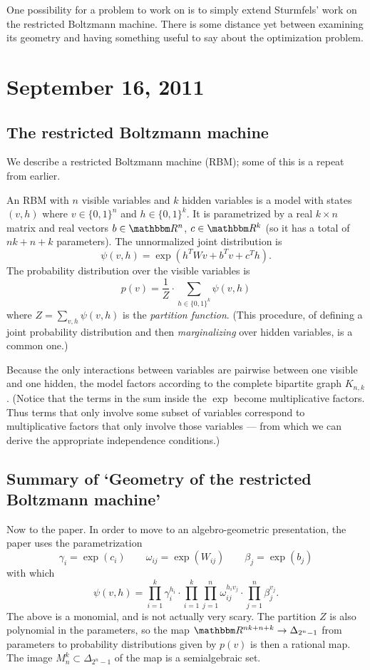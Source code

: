 \documentclass[12pt]{article}
\begin{document}
One possibility for a problem to work on is to simply extend Sturmfels' work on
the restricted Boltzmann machine.  There is some distance yet between examining
its geometry and having something useful to say about the optimization problem.

\section{September 16, 2011}


\subsection{The restricted Boltzmann machine}

We describe a restricted Boltzmann machine (RBM); some of this is a repeat from
earlier.

An RBM with $n$ visible variables and $k$ hidden variables is a model with
states $(v, h)$ where $v \in \{0,1\}^n$ and $h \in \{0,1\}^k$.  It is
parametrized by a real $k \times n$ matrix and real vectors $b \in \R^n$, $c \in
\R^k$ (so it has a total of $nk + n + k$ parameters).  The unnormalized joint
distribution is
\[
    \psi(v, h) = \exp(h^T W v + b^Tv + c^T h).
\]
The probability distribution over the visible variables is 
\[
    p(v) = \frac 1 Z \cdot \sum_{h \in \{0,1\}^k} \psi(v, h)
\]
where $Z = \sum_{v,h} \psi(v, h)$ is the \emph{partition function}.  (This
procedure, of defining a joint probability distribution and then
\emph{marginalizing} over hidden variables, is a common one.)

Because the only interactions between variables are pairwise between one visible
and one hidden, the model factors according to the complete bipartite graph
$K_{n,k}$.  (Notice that the terms in the sum inside the $\exp$ become
multiplicative factors.  Thus terms that only involve some subset of variables
correspond to multiplicative factors that only involve those variables --- from
which we can derive the appropriate independence conditions.)

\subsection{Summary of `Geometry of the restricted Boltzmann machine'}

Now to the paper.  In order to move to an algebro-geometric presentation, the
paper uses the parametrization
\[
    \gamma_i = \exp(c_i)
    \qquad
    \omega_{ij} = \exp(W_{ij})
    \qquad
    \beta_j = \exp(b_j)
\]
with which
\[
    \psi(v, h) = \prod_{i=1}^k \gamma_i^{h_i}
        \cdot 
        \prod_{i=1}^k \prod_{j=1}^n \omega_{ij}^{h_i v_j}
        \cdot
        \prod_{j=1}^n \beta_j^{v_j}.
\]
The above is a monomial, and is not actually very scary.  The partition $Z$ is
also polynomial in the parameters, so the map $\R^{nk+n+k} \to
\Delta_{2^n-1}$ from parameters to probability distributions given by $p(v)$ is
then a rational map.  The image $M_n^k \subset \Delta_{2^n - 1}$ of the map is a
semialgebraic set.
\end{document}
